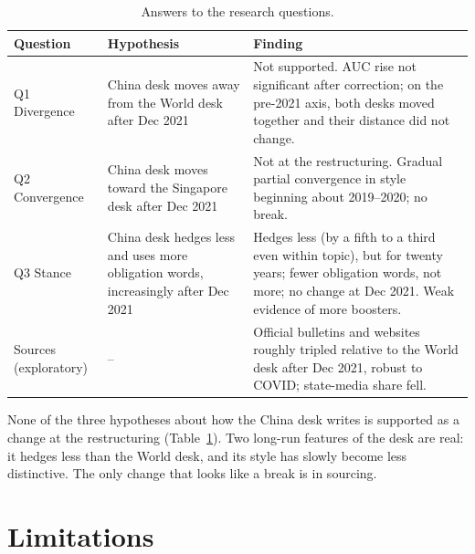 \documentclass[11pt]{article}
\begin{document}
\begin{table}[tbp]
\centering
\small
\begin{tabular}{@{}p{}p{}p{}@{}}
\toprule
Question & Hypothesis & Finding \\
\midrule
Q1 Divergence & China desk moves away from the World desk after Dec 2021 & Not supported. AUC rise not significant after correction; on the pre-2021 axis, both desks moved together and their distance did not change. \\
Q2 Convergence & China desk moves toward the Singapore desk after Dec 2021 & Not at the restructuring. Gradual partial convergence in style beginning about 2019--2020; no break. \\
Q3 Stance & China desk hedges less and uses more obligation words, increasingly after Dec 2021 & Hedges less (by a fifth to a third even within topic), but for twenty years; fewer obligation words, not more; no change at Dec 2021. Weak evidence of more boosters. \\
Sources (exploratory) & -- & Official bulletins and websites roughly tripled relative to the World desk after Dec 2021, robust to COVID; state-media share fell. \\
\bottomrule
\end{tabular}
\caption{Answers to the research questions.}
\label{tab:summary}
\end{table}

None of the three hypotheses about how the China desk writes is supported as a change at the restructuring (Table~\ref{tab:summary}). Two long-run features of the desk are real: it hedges less than the World desk, and its style has slowly become less distinctive. The only change that looks like a break is in sourcing.

\section{Limitations}
\end{document}

